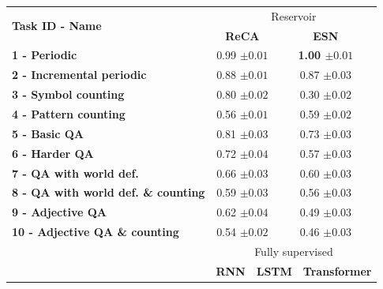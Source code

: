 \begin{table}[htbp]
  \centering
    \begin{tabular}{p{7cm}cccccc}
      \toprule
      \multirow{2}{*}{\bfseries Task ID - Name} & \multicolumn{6}{c}{Reservoir} \\
& \multicolumn{3}{c}{\bfseries ReCA}& \multicolumn{3}{c}{\bfseries ESN} \\
\midrule
\bfseries 1 - Periodic & \multicolumn{3}{c}{0.99 ${\scriptscriptstyle \pm 0.01}$} & \multicolumn{3}{c}{\bfseries 1.00 ${\scriptscriptstyle \pm 0.01}$}  \\
\bfseries 2 - Incremental periodic & \multicolumn{3}{c}{0.88 ${\scriptscriptstyle \pm 0.01}$} & \multicolumn{3}{c}{0.87 ${\scriptscriptstyle \pm 0.03}$}  \\
\bfseries 3 - Symbol counting & \multicolumn{3}{c}{0.80 ${\scriptscriptstyle \pm 0.02}$} & \multicolumn{3}{c}{0.30 ${\scriptscriptstyle \pm 0.02}$}  \\
\bfseries 4 - Pattern counting & \multicolumn{3}{c}{0.56
                                 ${\scriptscriptstyle \pm 0.01}$} & \multicolumn{3}{c}{ 0.59 ${\scriptscriptstyle \pm 0.02}$}\\
\bfseries 5 - Basic QA & \multicolumn{3}{c}{0.81 ${\scriptscriptstyle \pm 0.03}$} & \multicolumn{3}{c}{0.73 ${\scriptscriptstyle \pm 0.03}$} \\
\bfseries 6 - Harder QA & \multicolumn{3}{c}{0.72 ${\scriptscriptstyle \pm 0.04}$} & \multicolumn{3}{c}{0.57 ${\scriptscriptstyle \pm 0.03}$}\\
\bfseries 7 - QA with world def. & \multicolumn{3}{c}{0.66 ${\scriptscriptstyle \pm 0.03}$} & \multicolumn{3}{c}{0.60 ${\scriptscriptstyle \pm 0.03}$}\\
\bfseries 8 - QA with world def. \& counting & \multicolumn{3}{c}{0.59 ${\scriptscriptstyle \pm 0.03}$} & \multicolumn{3}{c}{0.56 ${\scriptscriptstyle \pm 0.03}$}\\
\bfseries 9 - Adjective QA & \multicolumn{3}{c}{0.62 ${\scriptscriptstyle \pm 0.04}$} & \multicolumn{3}{c}{0.49 ${\scriptscriptstyle \pm 0.03}$}\\
\bfseries 10 - Adjective QA \& counting & \multicolumn{3}{c}{0.54 ${\scriptscriptstyle \pm 0.02}$} & \multicolumn{3}{c}{0.46 ${\scriptscriptstyle \pm 0.03}$} \\
\midrule
      \multirow{2}{*}{} & \multicolumn{6}{c}{Fully supervised} \\
& \multicolumn{2}{c}{\bfseries RNN}& \multicolumn{2}{c}{\bfseries LSTM}  & \multicolumn{2}{c}{\bfseries Transformer} \\

\end{tabular}
\end{table}

